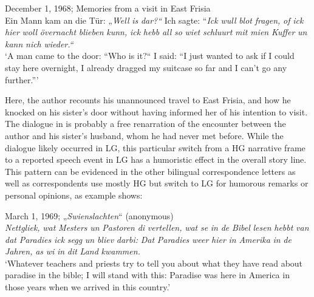 \documentclass[output=paper]{langsci/langscibook}
\begin{document}
  
\ea
\label{ex:rocker:11}
December 1, 1968; Memories from a visit in East Frisia\\
 
Ein Mann kam an die Tür: „\textit{Well} \textit{is} \textit{dar?“} Ich sagte: “\textit{Ick} \textit{wull} \textit{blot} \textit{fragen,} \textit{of} \textit{ick} \textit{hier} \textit{woll}  \textit{övernacht} \textit{blieben} \textit{kunn,} \textit{ick} \textit{hebb} \textit{all} \textit{so} \textit{wiet} \textit{schluurt} \textit{mit} \textit{mien} \textit{Kuffer} \textit{un} \textit{kann} \textit{nich}  \textit{wieder.“}\\

‘A man came to the door: “Who is it?“ I said: “I just wanted to ask if I could stay here  overnight, I already dragged my suitcase so far and I can’t go any further.”’
\z

Here, the author recounts his unannounced travel to East Frisia, and how he knocked on his sister’s door without having informed her of his intention to visit. The dialogue in  is probably a free renarration of the encounter between the author and his sister’s husband, whom he had never met before. While the dialogue likely occurred in LG, this particular switch from a HG narrative frame to a reported speech event in LG has a humoristic effect in the overall story line. This pattern can be evidenced in the other bilingual correspondence letters as well as correspondents use mostly HG but switch to LG for humorous remarks or personal opinions, as example  shows:

  
\ea
\label{ex:rocker:12} 
March 1, 1969; „\textit{Swienslachten}“ (anonymous)\\
\textit{Nettgliek,} \textit{wat} \textit{Mesters} \textit{un} \textit{Pastoren} \textit{di} \textit{vertellen,} \textit{wat} \textit{se} \textit{in} \textit{de} \textit{Bibel} \textit{lesen} \textit{hebbt} \textit{van} \textit{dat}  \textit{Paradies} \textit{ick} \textit{segg} \textit{un} \textit{bliev} \textit{darbi:} \textit{Dat} \textit{Paradies} \textit{weer} \textit{hier} \textit{in} \textit{Amerika} \textit{in} \textit{de} \textit{Jahren,} \textit{as} \textit{wi}  \textit{in} \textit{dit} \textit{Land} \textit{kwammen.} \\

‘Whatever teachers and priests try to tell you about what they have read about paradise in the bible; I will stand with this: Paradise was here in America in those years when we arrived in this country.’
\z
\end{document}
